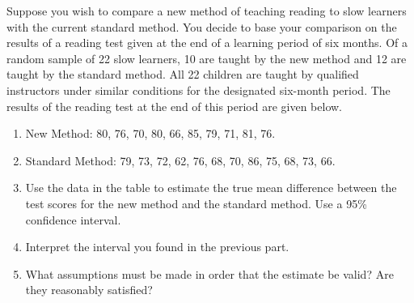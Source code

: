 
\begin{exercise}

Suppose you wish to compare a new method of teaching reading to slow
learners with the current standard method. You decide to base your
comparison on the results of a reading test given at the end of a learning
period of six months. Of a random sample of 22 slow learners, 10 are taught
by the new method and 12 are taught by the standard method.
All 22 children are taught by qualified instructors under similar
conditions for the designated six-month period. The results of the reading
test at the end of this period are given below.

\begin{enumerate}[label = (\alph*)]
    \item[] New Method: 80, 76, 70, 80, 66, 85, 79, 71, 81, 76.
    \item[] Standard Method: 79, 73, 72, 62, 76, 68, 70, 86, 75, 68, 73, 66.
    \item Use the data in the table to estimate the true mean difference
    between the test scores for the new method and the standard method.
    Use a 95\% confidence interval.
    \item Interpret the interval you found in the previous part.
    \item What assumptions must be made in order that the estimate be valid?
    Are they reasonably satisfied?
\end{enumerate}

\end{exercise}



